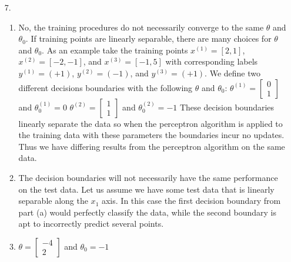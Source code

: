 \documentclass{article}
\begin{document}
\begin{enumerate}
\item[7.]
	\begin{enumerate}
	\item 
		  No, the training procedures do not necessarily converge to the same $\theta$ and $\theta_0$. If training points are linearly separable, there are many choices for $\theta$ and $\theta_0$.
		  \newline\newline
		  As an example take the training points $x^{(1)}=[2,1]$, $x^{(2)}=[-2,-1]$, and $x^{(3)}=[-1,5]$ with corresponding labels $y^{(1)}=(+1)$, $y^{(2)}=(-1)$, and $y^{(3)}=(+1)$.
		  \newline\newline
		  We define two different decisions boundaries with the following $\theta$ and $\theta_0$:
		  \newline\newline
		  $\theta^{(1)} = \left[ \begin{smallmatrix} 0\\1 \end{smallmatrix} \right]$ and $\theta^{(1)}_{0} = 0$
		  \newline\newline
		  $\theta^{(2)} = \left[ \begin{smallmatrix} 1\\1 \end{smallmatrix} \right]$ and $\theta^{(2)}_{0} = -1$
		  \newline\newline
		  These decision boundaries linearly separate the data so when the perceptron algorithm is applied to the training data with these parameters the boundaries incur no updates. Thus we have differing results from the perceptron algorithm on the same data.
	\item 
		  The decision boundaries will not necessarily have the same performance on the test data. Let us assume we have some test data that is linearly separable along the $x_1$ axis. In this case the first decision 		boundary from part (a) would perfectly classify the data, while the second boundary is apt to incorrectly predict several points.  
	\item 
		   $\theta = \left[ \begin{smallmatrix} -4\\2 \end{smallmatrix} \right]$ and $\theta_0 = -1$
	\end{enumerate}

\bigskip


\end{enumerate}
\end{document}
